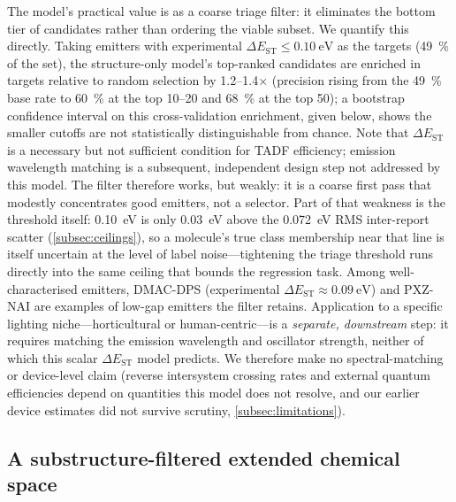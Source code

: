 The model's practical value is as a coarse triage filter: it eliminates the bottom
tier of candidates rather than ordering the viable subset. We quantify this directly. Taking emitters with experimental
$\Delta E_\text{ST}\le\qty{0.10}{\electronvolt}$ as the targets (\qty{49}{\percent}
of the set), the structure-only model's top-ranked candidates are enriched in
targets relative to random selection by \numrange{1.2}{1.4}$\times$
(precision rising from the \qty{49}{\percent} base rate to \qty{60}{\percent} at
the top \num{10}--\num{20} and \qty{68}{\percent} at the top \num{50}); a bootstrap
confidence interval on this cross-validation enrichment, given below, shows the smaller cutoffs are
not statistically distinguishable from chance.
Note that $\Delta E_\text{ST}$ is a necessary but not sufficient condition for TADF
efficiency; emission wavelength matching is a subsequent, independent design step
not addressed by this model.
The filter therefore works, but weakly: it is a coarse
first pass that modestly concentrates good emitters, not a selector. Part of that
weakness is the threshold itself: \qty{0.10}{\electronvolt} is only
\qty{0.03}{\electronvolt} above the \qty{0.072}{\electronvolt} RMS inter-report
scatter (\cref{subsec:ceilings}), so a molecule's true class membership near that
line is itself uncertain at the level of label noise---tightening the triage
threshold runs directly into the same ceiling that bounds the regression task.
Among well-characterised emitters, DMAC-DPS
(experimental $\Delta E_\text{ST}\approx\qty{0.09}{\electronvolt}$) and PXZ-NAI are
examples of low-gap emitters the filter retains.
Application to a specific lighting niche---horticultural or human-centric---is a
\emph{separate, downstream} step: it requires matching the emission wavelength and
oscillator strength, neither of which this scalar $\Delta E_\text{ST}$ model predicts.
We therefore make no spectral-matching or device-level claim (reverse intersystem
crossing rates and external quantum efficiencies depend on quantities this model does
not resolve, and our earlier device estimates did not survive scrutiny,
\cref{subsec:limitations}).

\subsection{A substructure-filtered extended chemical space}\label{subsec:library}

